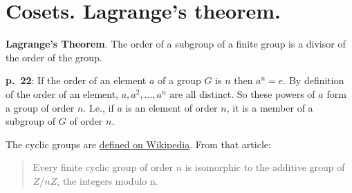 \section{Cosets. Lagrange's theorem.}

{\bf Lagrange's Theorem}. The order of a subgroup of a finite group is
a divisor of the order of the group.

{\bf p.\ 22}: If the order of an element $a$ of a group $G$ is $n$
then $a^n = e$. By definition of the order of an element,
$a,a^2,...,a^n$ are all distinct. So these powers of $a$ form a group
of order $n$. I.e., if $a$ is an element of order $n$, it is a member
of a subgroup of $G$ of order $n$.

The cyclic groups are
\href{https://en.wikipedia.org/wiki/Cyclic_group}{defined on
  Wikipedia}. From that article:

\begin{quote}
Every finite cyclic group of order $n$ is isomorphic to the additive
group of $Z/nZ$, the integers modulo n.
\end{quote}


